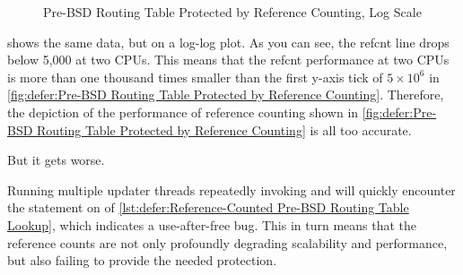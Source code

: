 {{\begin{figure}
\centering
{}
\caption{Pre-BSD Routing Table Protected by Reference Counting, Log Scale}
\label{fig:defer:Pre-BSD Routing Table Protected by Reference Counting; Log Scale}
\end{figure}

	shows the same data, but on a log-log plot.
	As you can see, the refcnt line drops below 5,000 at two CPUs.
	This means that the refcnt performance at two CPUs is more than
	one thousand times smaller than the first y-axis tick of
	$5 \times 10^6$ in
	\cref{fig:defer:Pre-BSD Routing Table Protected by Reference Counting}.
	Therefore, the depiction of the performance of reference counting
	shown in
	\cref{fig:defer:Pre-BSD Routing Table Protected by Reference Counting}
	is all too accurate.
}\QuickQuizEndE
}

But it gets worse.

Running multiple updater threads repeatedly invoking
 and  will quickly encounter the
 statement on
 of
\cref{lst:defer:Reference-Counted Pre-BSD Routing Table Lookup},
which indicates a use-after-free bug.
This in turn means that the reference counts are not only profoundly
degrading scalability and performance, but also failing to provide
the needed protection.

